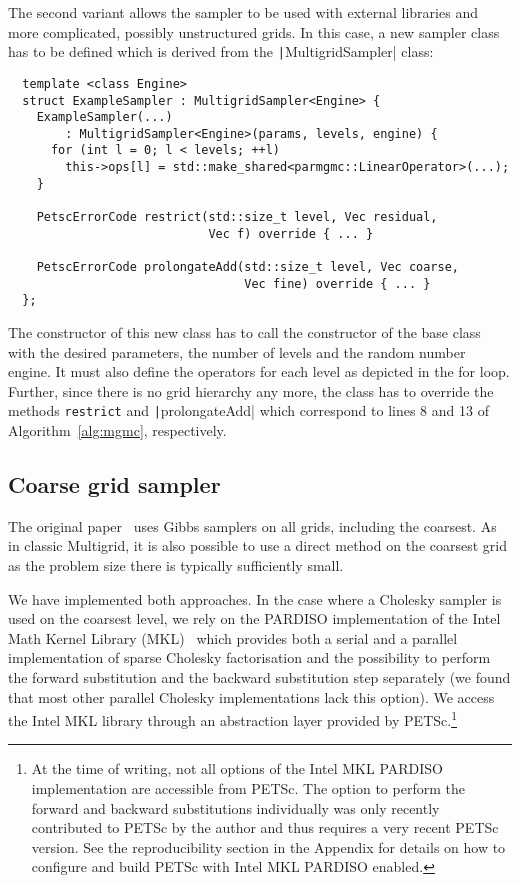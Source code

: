 \documentclass[
fontsize=11pt,
paper=a4,
numbers=noenddot
]{scrartcl}
\begin{document}
The second variant allows the sampler to be used with external libraries and more complicated, possibly unstructured grids. In this case, a new sampler class has to be defined which is derived from the \texttt|MultigridSampler| class:
\begin{verbatim}
  template <class Engine> 
  struct ExampleSampler : MultigridSampler<Engine> {
    ExampleSampler(...)
        : MultigridSampler<Engine>(params, levels, engine) {
      for (int l = 0; l < levels; ++l)
        this->ops[l] = std::make_shared<parmgmc::LinearOperator>(...);
    }

    PetscErrorCode restrict(std::size_t level, Vec residual, 
                            Vec f) override { ... }

    PetscErrorCode prolongateAdd(std::size_t level, Vec coarse,
                                 Vec fine) override { ... }
  };    
\end{verbatim}
The constructor of this new class has to call the constructor of the base class with the desired parameters, the number of levels and the random number engine. It must also define the operators for each level as depicted in the for loop. Further, since there is no grid hierarchy any more, the class has to override the methods \texttt{restrict} and \texttt|prolongateAdd| which correspond to lines 8 and 13 of Algorithm~\ref{alg:mgmc}, respectively.

\subsection{Coarse grid sampler}
The original paper~\cite{goodmansokal} uses Gibbs samplers on all grids, including the coarsest. As in classic Multigrid, it is also possible to use a direct method on the coarsest grid as the problem size there is typically sufficiently small. 

We have implemented both approaches. In the case where a Cholesky sampler is used on the coarsest level, we rely on the PARDISO implementation of the Intel Math Kernel Library (MKL)~\cite{intelmkl} which provides both a serial and a parallel implementation of sparse Cholesky factorisation and the possibility to perform the forward substitution and the backward substitution step separately (we found that most other parallel Cholesky implementations lack this option). We access the Intel MKL library through an abstraction layer provided by PETSc.\footnote{At the time of writing, not all options of the Intel MKL PARDISO implementation are accessible from PETSc. The option to perform the forward and backward substitutions individually was only recently contributed to PETSc by the author and thus requires a very recent PETSc version. See the reproducibility section in the Appendix for details on how to configure and build PETSc with Intel MKL PARDISO enabled.} 
\end{document}
